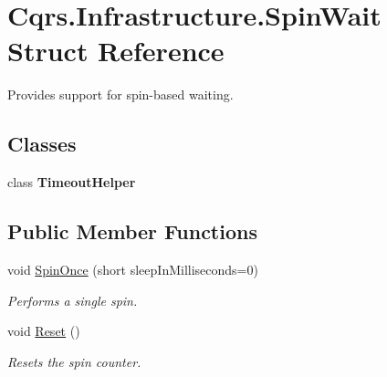 \hypertarget{structCqrs_1_1Infrastructure_1_1SpinWait}{}\section{Cqrs.\+Infrastructure.\+Spin\+Wait Struct Reference}
\label{structCqrs_1_1Infrastructure_1_1SpinWait}


Provides support for spin-\/based waiting.  


\subsection*{Classes}
\begin{DoxyCompactItemize}
\item 
class {\bfseries Timeout\+Helper}
\end{DoxyCompactItemize}
\subsection*{Public Member Functions}
\begin{DoxyCompactItemize}
\item 
void \hyperlink{structCqrs_1_1Infrastructure_1_1SpinWait_a2df9b40d5281fda47702cc99fac7e6d3}{Spin\+Once} (short sleep\+In\+Milliseconds=0)
\begin{DoxyCompactList}\small\item\em Performs a single spin. \end{DoxyCompactList}\item 
void \hyperlink{structCqrs_1_1Infrastructure_1_1SpinWait_a32a06438f849dc88a0fce77b23e3271e}{Reset} ()
\begin{DoxyCompactList}\small\item\em Resets the spin counter. \end{DoxyCompactList}\end{DoxyCompactItemize}

